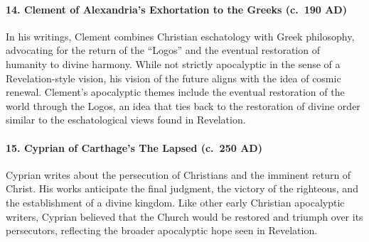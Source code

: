\paragraph{14.
Clement of Alexandria's Exhortation to the Greeks (c.~190 AD)}\label{par:clement-of-alexandrias-exhortation-to-the-greeks-c.-190-ad}

In his writings, Clement combines Christian eschatology with Greek philosophy, advocating for the return of the ``Logos'' and the eventual restoration of humanity to divine harmony.
While not strictly apocalyptic in the sense of a Revelation-style vision, his vision of the future aligns with the idea of cosmic renewal.
Clement's apocalyptic themes include the eventual restoration of the world through the Logos, an idea that ties back to the restoration of divine order similar to the eschatological views found in Revelation.

\paragraph{15.
Cyprian of Carthage's The Lapsed (c.~250 AD)}\label{par:cyprian-of-carthages-the-lapsed-c.-250-ad}

Cyprian writes about the persecution of Christians and the imminent return of Christ.
His works anticipate the final judgment, the victory of the righteous, and the establishment of a divine kingdom.
Like other early Christian apocalyptic writers, Cyprian believed that the Church would be restored and triumph over its persecutors, reflecting the broader apocalyptic hope seen in Revelation.
